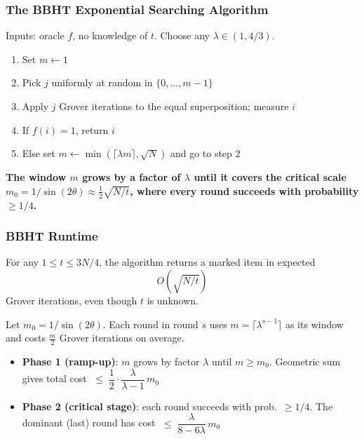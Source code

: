 \documentclass[xcolor=table]{beamer}
\theoremstyle{remark}
\theoremstyle{plain}
\begin{document}
\begin{frame}
  \frametitle{The BBHT Exponential Searching Algorithm}
  Inputs: oracle $f$, no knowledge of $t$. Choose any $\lambda \in (1, 4/3)$.

  \vspace{0.3cm}
  \begin{enumerate}
    \item Set $m \leftarrow 1$
    \item Pick $j$ uniformly at random in $\{0, \dots, m-1\}$
    \item Apply $j$ Grover iterations to the equal superposition; measure $i$
    \item If $f(i) = 1$, return $i$
    \item Else set $m \leftarrow \min(\lceil \lambda m \rceil, \sqrt{N})$ and go to step 2
  \end{enumerate}

  \vspace{0.4cm}
  \textbf{The window $m$ grows by a factor of $\lambda$ until it covers the critical scale
  $m_0 = 1/\sin(2\theta) \approx \tfrac{1}{2}\sqrt{N/t}$, where every round succeeds with probability $\ge 1/4$.}
\end{frame}

\begin{frame}
  \frametitle{BBHT Runtime}
  \begin{theorem}
    For any $1 \le t \le 3N/4$, the algorithm returns a marked item in expected
    \[
      O\!\left(\sqrt{N/t}\right)
    \]
    Grover iterations, even though $t$ is unknown.
  \end{theorem}

  \vspace{0.4cm}
  Let $m_0 = 1/\sin(2\theta)$. Each round in round $s$ uses $m = \lceil \lambda^{s-1} \rceil$ as its window and costs $\tfrac{m}{2}$ Grover iterations on average.

  \vspace{0.3cm}
  \begin{itemize}
    \item \textbf{Phase 1 (ramp-up)}: $m$ grows by factor $\lambda$ until $m \ge m_0$.
      Geometric sum gives total cost
      $\;\le\; \dfrac{1}{2}\cdot\dfrac{\lambda}{\lambda - 1}\, m_0$
    \item \textbf{Phase 2 (critical stage)}: each round succeeds with prob.\ $\ge 1/4$.
      The dominant (last) round has cost
      $\;\le\; \dfrac{\lambda}{8 - 6\lambda}\, m_0$
  \end{itemize}
\end{frame}
\end{document}
